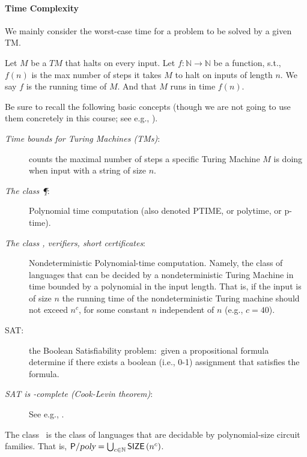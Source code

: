 \paragraph{Time Complexity}
We mainly consider the worst-case time for a problem to be solved by a given TM.

\begin{definition}
    Let $M$ be a $T M$ that halts on every input. Let $f: \mathbb{N} \rightarrow \mathbb{N}$ be a function, s.t., $f(n)$ is the max number  of steps it takes $M$ to halt on inputs of length $n$. We say $f$ is the running time of $M$. And that $M$ runs in time $f(n)$.
\end{definition}




Be sure to recall the following basic concepts   (though we are not going to use them concretely in this course; see e.g., \cite{AB09}).

\begin{description}
\item[\textit{Time bounds for Turing Machines (TMs)}:] counts the maximal number of steps a specific Turing Machine $M$ is doing when input with a string of  size $n$. 

\item[\textit{The class \P}:]  Polynomial time computation (also denoted  PTIME, or polytime, or p-time).

\item[\textit{The class \NP, verifiers, short certificates}:] Nondeterministic Polynomial-time computation. Namely, the class of languages that can be decided by a nondeterministic Turing Machine in time bounded by a polynomial in the input length.  That is, if the input is of size $n$ the running time of the nondeterministic Turing machine should not exceed $n^c$, for some constant $n$ independent of $n$ (e.g.,  $c=40$). 

\item[SAT:] the Boolean Satisfiability problem:\ given a propositional formula determine if there exists a boolean (i.e., 0-1) assignment that satisfies the formula. 

\item[\textit{SAT is \NP-complete (Cook-Levin theorem)}:] See e.g., \cite{AB09,Pap94}.
\end{description}






\begin{definition} The class \Ppoly~is the class of languages that are decidable by polynomial-size circuit families.
That is, ${\mathsf{P}}/{\textsl{poly}}=\bigcup_{c \in \mathbb{N}} \operatorname{{\mathsf{SIZE}}}\left(n^c\right)$.
\end{definition}



